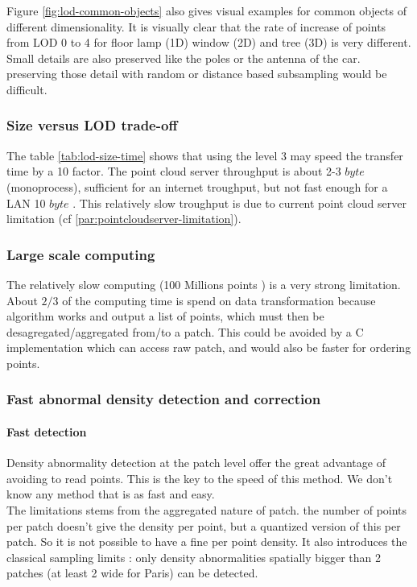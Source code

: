 			 Figure \ref{fig:lod-common-objects} also gives visual examples for common objects of different dimensionality.
			 It is visually clear that the rate of increase of points from LOD 0 to 4 for floor lamp (1D) window (2D) and tree (3D) is very different.
			 Small details are also preserved like the poles or the antenna of the car. preserving those detail with random or distance based subsampling would be difficult.
			 
		 \subsubsection{Size versus LOD trade-off}
		 \label{point-cloud-server-troughput}
			 The table \ref{tab:lod-size-time} shows that using the level 3 may speed the transfer time by a 10 factor.
			 The point cloud server throughput is about 2-3 \mega $byte$ \per \second  (monoprocess),  sufficient for an internet troughput, but not fast enough for a LAN 10 \mega $byte$ \per \second.
			 This relatively slow troughput is due to current point cloud server limitation (cf \ref{par:pointcloudserver-limitation}).
		 \subsubsection{Large scale computing}
			 
			 The relatively slow computing (100 Millions points \per \second ) is a very strong limitation.
			 About $2/3$ of the computing time is spend on data transformation because algorithm works and output a list of points, which must then be desagregated/aggregated from/to a patch.
			 This could be avoided by a C implementation which can access raw patch, and would also be faster for ordering points.
			    
		 \subsubsection{Fast abnormal density detection and correction}
			 \paragraph{Fast detection}
				 Density abnormality detection at the patch level offer the great advantage of avoiding to read points. This is the key to the speed of this method. We don't know any method that is as fast and easy.
				 \\
				 The limitations stems from the aggregated nature of patch. the number of points per patch doesn't give the density per point, but a quantized version of this per patch.
				 So it is not possible to have a fine per point density.
				 It also introduces the classical sampling limits : only density abnormalities spatially bigger than 2 patches (at least 2 \meter \space wide for Paris) can be detected.
				 
